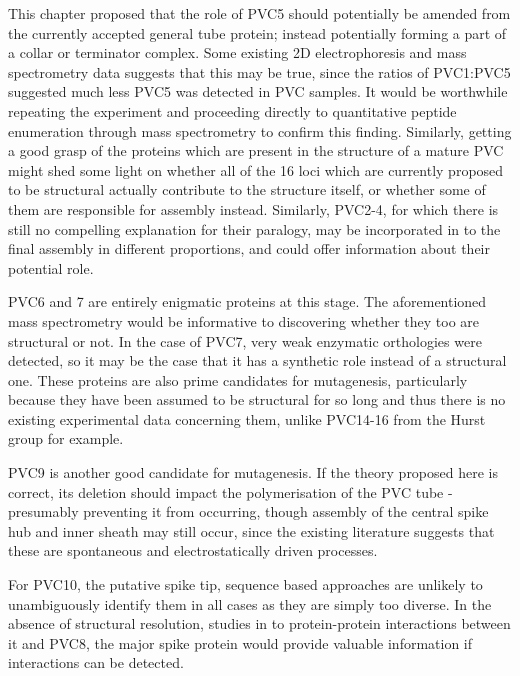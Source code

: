 This chapter proposed that the role of PVC5 should potentially be amended from the currently accepted general tube protein; instead potentially forming a part of a collar or terminator complex. Some existing 2D electrophoresis and mass spectrometry data suggests that this may be true, since the ratios of PVC1:PVC5 suggested much less PVC5 was detected in PVC samples. It would be worthwhile repeating the experiment and proceeding directly to quantitative peptide enumeration through mass spectrometry to confirm this finding. Similarly, getting a good grasp of the proteins which are present in the structure of a mature PVC might shed some light on whether all of the 16 loci which are currently proposed to be structural actually contribute to the structure itself, or whether some of them are responsible for assembly instead. Similarly, PVC2-4, for which there is still no compelling explanation for their paralogy, may be incorporated in to the final assembly in different proportions, and could offer information about their potential role.

PVC6 and 7 are entirely enigmatic proteins at this stage. The aforementioned mass spectrometry would be informative to discovering whether they too are structural or not. In the case of PVC7, very weak enzymatic orthologies were detected, so it may be the case that it has a synthetic role instead of a structural one. These proteins are also prime candidates for mutagenesis, particularly because they have been assumed to be structural for so long and thus there is no existing experimental data concerning them, unlike PVC14-16 from the Hurst group for example.

PVC9 is another good candidate for mutagenesis. If the theory proposed here is correct, its deletion should impact the polymerisation of the PVC tube - presumably preventing it from occurring, though assembly of the central spike hub and inner sheath may still occur, since the existing literature suggests that these are spontaneous and electrostatically driven processes.

For PVC10, the putative spike tip, sequence based approaches are unlikely to unambiguously identify them in all cases as they are simply too diverse. In the absence of structural resolution, studies in to protein-protein interactions between it and PVC8, the major spike protein would provide valuable information if interactions can be detected.

